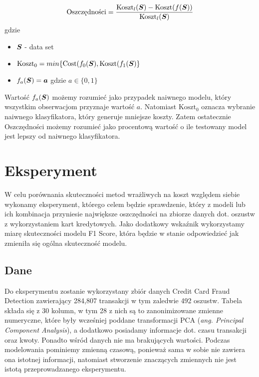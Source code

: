 \documentclass[openany]{book}
\begin{document}
	\begin{equation}
	\text{Oszczędności} = \frac{\text{Koszt}_{l}(\boldsymbol{S}) - \text{Koszt}(f(\boldsymbol{S}))}{\text{Koszt}_{l}(\boldsymbol{S})}
	\end{equation}
	gdzie
	\begin{itemize}
		\item $ \boldsymbol{S} $ - data set
		\item $ \text{Koszt}_0 = min\{\text{Cost}(f_{0}(\boldsymbol{S}), \text{Koszt}(f_{1}(\boldsymbol{S})\} $
		\item $ f_{a}(\boldsymbol{S}) = \boldsymbol{a} $ gdzie $a \in \{0,1\}$
	\end{itemize}{}
	Wartość $ f_{a}(\boldsymbol{S})$ możemy rozumieć jako przypadek naiwnego modelu, który wszystkim obserwacjom przyznaje wartość $a$. Natomiast $ \text{Koszt}_0 $ oznacza wybranie naiwnego klasyfikatora, który generuje mniejsze koszty. Zatem ostatecznie Oszczędności możemy rozumieć jako procentową wartość o ile testowany model jest lepszy od naiwnego klasyfikatora.
	
	
\chapter{Eksperyment}
	W celu porównania skuteczności metod wrażliwych na koszt względem siebie wykonamy eksperyment, którego celem będzie sprawdzenie, który z modeli lub ich kombinacja przyniesie największe oszczędności na zbiorze danych dot. oszustw z wykorzystaniem kart kredytowych. Jako dodatkowy wskaźnik wykorzystamy miarę skuteczności modelu F1 Score, która będzie w stanie odpowiedzieć jak zmieniła się ogólna skuteczność modelu.

\section{Dane}
	Do eksperymentu zostanie wykorzystany zbiór danych Credit Card Fraud Detection zawierający 284,807 transakcji w tym zaledwie 492 oszustw. Tabela składa się z 30 kolumn, w tym 28 z nich są to zanonimizowane zmienne numeryczne, które były wcześniej poddane transformacji PCA (\textit{ang. Principal Component Analysis}), a dodatkowo posiadamy informacje dot. czasu transakcji oraz kwoty. Ponadto wśród danych nie ma brakujących wartości. Podczas modelowania pominiemy zmienną czasową, ponieważ sama w sobie nie zawiera ona istotnej informacji, natomiast stworzenie znaczących zmiennych nie jest istotą przeprowadzanego eksperymentu. 
	
\end{document}
